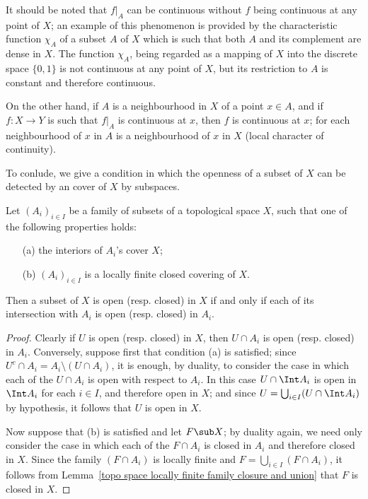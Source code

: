 It should be noted that $f|_A$ can be continuous without $f$ being continuous at any point of $X$; an example of this phenomenon is provided by the characteristic function $\chi_A$ of a subset $A$ of $X$ which is such that both $A$ and its complement are dense in $X$. The function $\chi_A$, being regarded as a mapping of $X$ into the discrete space $\{0,1\}$ is not continuous at any point of $X$, but its restriction to $A$ is constant and therefore continuous.\par
On the other hand, if $A$ is a neighbourhood in $X$ of a point $x\in A$, and if $f:X\to Y$ is such that $f|_A$ is continuous at $x$, then $f$ is continuous at $x$; for each neighbourhood of $x$ in $A$ is a neighbourhood of $x$ in $X$ (local character of continuity).\par
To conlude, we give a condition in which the openness of a subset of $X$ can be detected by an cover of $X$ by subspaces.
\begin{proposition}\label{topo space coproduct topology if}
Let $(A_i)_{i\in I}$ be a family of subsets of a topological space $X$, such that one of the following properties holds:
\begin{itemize}
\item[(a)] the interiors of $A_i$'s cover $X$;
\item[(b)] $(A_i)_{i\in I}$ is a locally finite closed covering of $X$.
\end{itemize}
Then a subset of $X$ is open (resp. closed) in $X$ if and only if each of its intersection with $A_i$ is open (resp. closed) in $A_i$.
\end{proposition}
\begin{proof}
Clearly if $U$ is open (resp. closed) in $X$, then $U\cap A_i$ is open (resp. closed) in $A_i$. Conversely, suppose first that condition (a) is satisfied; since $U^c\cap A_i=A_i\setminus(U\cap A_i)$, it is enough, by duality, to consider the case in which each of the $U\cap A_i$ is open with respect to $A_i$. In this case $U\cap\Int A_i$ is open in $\Int A_i$ for each $i\in I$, and therefore open in $X$; and since $U=\bigcup_{i\in I}(U\cap\Int A_i)$ by hypothesis, it follows that $U$ is open in $X$.\par
Now suppose that (b) is satisfied and let $F\sub X$; by duality again, we need only consider the case in which each of the $F\cap A_i$ is closed in $A_i$ and therefore closed in $X$. Since the family $(F\cap A_i)$ is locally finite and $F=\bigcup_{i\in I}(F\cap A_i)$, it follows from Lemma~\ref{topo space locally finite family closure and union} that $F$ is closed in $X$.
\end{proof}
